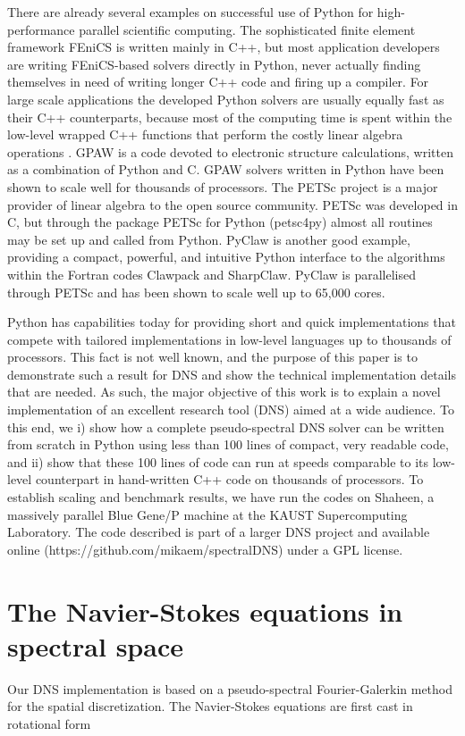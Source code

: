 \documentclass[final,3p,times,twocolumn]{elsarticle}
\begin{document}
There are already several examples on successful use of Python for
high-performance parallel scientific computing. The sophisticated
finite element framework FEniCS \cite{fenics} is written mainly in
C++, but most application developers are writing FEniCS-based solvers
directly in Python, never actually finding themselves in need of
writing longer C++ code and firing up a compiler. For large scale
applications the developed Python solvers are usually equally fast as
their C++ counterparts, because most of the computing time is
spent within the low-level wrapped C++ functions that perform the
costly linear algebra operations \cite{Mortensen2015}.
GPAW \cite{gpaw05} is a code devoted
to electronic structure calculations, written as a combination of
Python and C. GPAW solvers written in Python have been shown to scale
well for thousands of processors.  The PETSc project \cite{petsc-web-page} is a 
major provider of linear algebra to the open source community. PETSc was
developed in C, but through the package PETSc for Python (petsc4py) almost all
routines may be set up and called from Python. PyClaw \cite{ketcheson2012}
is another good example, providing a compact, powerful, and intuitive
Python interface to the algorithms within the Fortran codes Clawpack
and SharpClaw. PyClaw is parallelised through PETSc and has been shown
to scale well up to 65,000 cores.

Python has capabilities today for providing short and quick implementations 
that compete with tailored implementations in low-level languages up to 
thousands of processors. This fact is not well known, and the purpose of this 
paper is to demonstrate such a result for DNS and show the technical 
implementation details that are needed. As such, the major objective of this 
work is to explain a novel implementation of an excellent research tool (DNS) 
aimed at a wide audience. To this end, we i) show how a complete 
pseudo-spectral DNS solver can be written from scratch in Python using less 
than 100 lines of compact, very readable code, and ii) show that these 100 
lines of code can run at speeds comparable to its low-level counterpart in 
hand-written C++ code on thousands of processors. To establish scaling and 
benchmark results, we have run the codes on Shaheen, a massively parallel 
Blue Gene/P machine at the KAUST Supercomputing Laboratory. The code described 
is part of a larger DNS project and available online 
(https://github.com/mikaem/spectralDNS) under a GPL license. 

\section{The Navier-Stokes equations in spectral space}
Our DNS implementation is based on a pseudo-spectral Fourier-Galerkin method \cite{canuto1988} for the spatial discretization. The Navier-Stokes equations are first cast in rotational form
\end{document}
